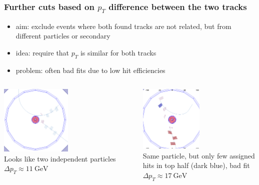 \documentclass[18pt]{beamer}
\begin{document}
\begin{frame}
  \frametitle{Further cuts based on $p_T$ difference between the two tracks}
  \begin{itemize}
  \item aim: exclude events where both found tracks are not related, but from different particles or secondary
  \item idea: require that $p_T$ is similar for both tracks
  \item problem: often bad fits due to low hit efficiencies
  \end{itemize}

  \begin{columns}
    \begin{column}{0.5\textwidth}
      \center
      \includegraphics[width=0.5\textwidth]{figures/b2display_screenshots/gcr_data_2017-08_run3912_evt964508_f57_two_unrelated_tracks.png}\\
      Looks like two independent particles
      \\$\Delta p_T \approx \SI{11}{\GeV}$
    \end{column}
    \begin{column}{0.5\textwidth}
      \center
      \includegraphics[width=0.5\textwidth]{figures/b2display_screenshots/gcr_data_2017-08_run3920_evt31009_two_tracks_found_but_bad_fit_r-phi.png}\\
      Same particle, but only few assigned hits in top half (dark blue), bad fit\\
      $\Delta p_T \approx \SI{17}{\GeV}$
    \end{column}
  \end{columns}
\end{frame}
\end{document}
